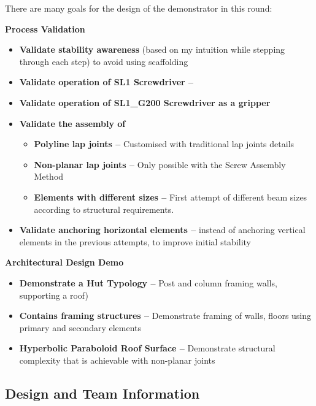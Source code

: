 There are many goals for the design of the demonstrator in this round:

\textbf{Process Validation}
\begin{itemize}
    \item \textbf{Validate stability awareness} (based on my intuition while stepping through each step) to avoid using scaffolding 
    \item \textbf{Validate operation of SL1 Screwdriver --} 
    \item \textbf{Validate operation of SL1\_G200 Screwdriver as a gripper}
    \item \textbf{Validate the assembly of}
    \begin{itemize}
        \item \textbf{Polyline lap joints --} Customised with traditional lap joints details 
        \item \textbf{Non-planar lap joints --} Only possible with the Screw Assembly Method 
        \item \textbf{Elements with different sizes --} First attempt of different beam sizes according to structural requirements.
    \end{itemize}
    \item \textbf{Validate anchoring horizontal elements --} instead of anchoring vertical elements in the previous attempts, to improve initial stability
\end{itemize}
\textbf{Architectural Design Demo}
\begin{itemize}
    \item \textbf{Demonstrate a Hut Typology --} Post and column framing walls, supporting a roof)
    \item \textbf{Contains framing structures --} Demonstrate framing of walls, floors using primary and secondary elements
    \item \textbf{Hyperbolic Paraboloid Roof Surface --} Demonstrate structural complexity that is achievable with non-planar joints
\end{itemize}

\FloatBarrier

\subsection{Design and Team Information}
\label{subsection:exploration-4-design-and-team-information}

